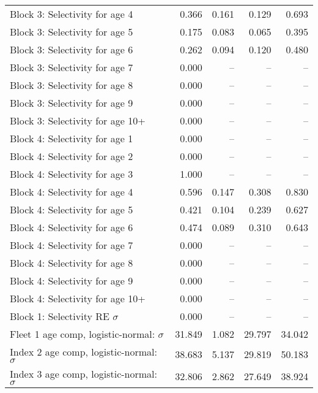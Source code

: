 \documentclass[
]{article}
\begin{document}
\begin{landscape}
\begin{longtable}[t]{lrrrr}
Block 3: Selectivity for age 4 & 0.366 & 0.161 & 0.129 & 0.693\\
Block 3: Selectivity for age 5 & 0.175 & 0.083 & 0.065 & 0.395\\
Block 3: Selectivity for age 6 & 0.262 & 0.094 & 0.120 & 0.480\\
Block 3: Selectivity for age 7 & 0.000 & -- & -- & --\\
\addlinespace
Block 3: Selectivity for age 8 & 0.000 & -- & -- & --\\
Block 3: Selectivity for age 9 & 0.000 & -- & -- & --\\
Block 3: Selectivity for age 10+ & 0.000 & -- & -- & --\\
Block 4: Selectivity for age 1 & 0.000 & -- & -- & --\\
Block 4: Selectivity for age 2 & 0.000 & -- & -- & --\\
\addlinespace
Block 4: Selectivity for age 3 & 1.000 & -- & -- & --\\
Block 4: Selectivity for age 4 & 0.596 & 0.147 & 0.308 & 0.830\\
Block 4: Selectivity for age 5 & 0.421 & 0.104 & 0.239 & 0.627\\
Block 4: Selectivity for age 6 & 0.474 & 0.089 & 0.310 & 0.643\\
Block 4: Selectivity for age 7 & 0.000 & -- & -- & --\\
\addlinespace
Block 4: Selectivity for age 8 & 0.000 & -- & -- & --\\
Block 4: Selectivity for age 9 & 0.000 & -- & -- & --\\
Block 4: Selectivity for age 10+ & 0.000 & -- & -- & --\\
Block 1: Selectivity RE $\sigma$ & 0.000 & -- & -- & --\\
Fleet 1 age comp, logistic-normal: $\sigma$ & 31.849 & 1.082 & 29.797 & 34.042\\
\addlinespace
Index 2 age comp, logistic-normal: $\sigma$ & 38.683 & 5.137 & 29.819 & 50.183\\
Index 3 age comp, logistic-normal: $\sigma$ & 32.806 & 2.862 & 27.649 & 38.924\\*
\end{longtable}
\end{landscape}
\end{document}

